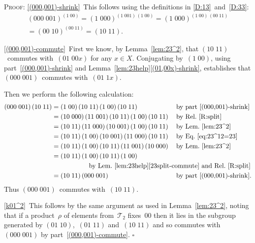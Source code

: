 \documentclass[a4paper,11pt]{article}
\numberwithin{equation}{section}
\newcommand{\swap}[2]{(#1\;#2)}
\newcommand{\Sw}[1]{\mathcal{T}_{#1}}
\newcommand{\qed}{\hspace*{\fill}$\square$}
\newenvironment{proof}{%
  \begin{trivlist}\item\textsc{Proof:}}{\qed\end{trivlist}}
\begin{document}
\begin{proof}
  \ref{(000,001)-shrink}~This follows using the definitions in
  \eqref{D:13}~and~\eqref{D:33}:
  \begin{multline*}
    \swap{000}{001}^{\swap{1}{00}} =
    \swap{1}{000}^{\swap{1}{001} \, \swap{1}{00}} =
    \swap{1}{000}^{\swap{1}{00} \, \swap{00}{11}} \\
    = \swap{00}{10}^{\swap{00}{11}} = \swap{10}{11}.
  \end{multline*}

  \ref{(000,001)-commute}~First we know, by Lemma~\ref{lem:23^2}, that
  $\swap{10}{11}$~commutes with~$\swap{01}{00x}$ for any $x \in X$.
  Conjugating by~$\swap{1}{00}$, using part~\ref{(000,001)-shrink} and
  Lemma~\ref{lem:23help}\ref{(01,00x)-shrink}, establishes that
  $\swap{000}{001}$~commutes with~$\swap{01}{1x}$.

  Then we perform the following calculation:
  \begin{align*}
    \swap{000}{001} \, \swap{10}{11}
    &= \swap{1}{00} \, \swap{10}{11} \, \swap{1}{00} \, \swap{10}{11}
    &&\text{by part~\ref{(000,001)-shrink}} \\
    &= \swap{10}{000} \, \swap{11}{001} \, \swap{10}{11} \,
    \swap{1}{00} \, \swap{10}{11}
    &&\text{by Rel.~\ref{R:split}} \\
    &= \swap{10}{11} \, \swap{11}{000} \, \swap{10}{001} \,
    \swap{1}{00} \, \swap{10}{11}
    &&\text{by Lem.~\ref{lem:23^2}} \\
    &= \swap{10}{11} \, \swap{1}{00} \, \swap{10}{001} \,
    \swap{11}{000} \, \swap{10}{11}
    &&\text{by Eq.~\eqref{eq:23^12=23}} \\
    &= \swap{10}{11} \, \swap{1}{00} \, \swap{10}{11} \,
    \swap{11}{001} \, \swap{10}{000}
    &&\text{by Lem.~\ref{lem:23^2}} \\
    &= \swap{10}{11} \, \swap{1}{00} \, \swap{10}{11} \, \swap{1}{00} \\
    &\mbox{}\hspace*{18em}\makebox[0pt]{by Lem.~\ref{lem:23help}\ref{23split-commute} and
      Rel.~\ref{R:split}} \\
    &= \swap{10}{11} \, \swap{000}{001}
    &&\text{by part~\ref{(000,001)-shrink}.}
  \end{align*}
  Thus $\swap{000}{001}$~commutes with~$\swap{10}{11}$.

  \ref{k01^2}~This follows by the same argument as used in
  Lemma~\ref{lem:23^2}, noting that if a product~$\rho$ of elements
  from~$\Sw{2}$ fixes~$00$ then it lies in the subgroup generated by
  $\swap{01}{10}$,~$\swap{01}{11}$ and~$\swap{10}{11}$ and so commutes
  with~$\swap{000}{001}$ by part~\ref{(000,001)-commute}.
\end{proof}
\end{document}
